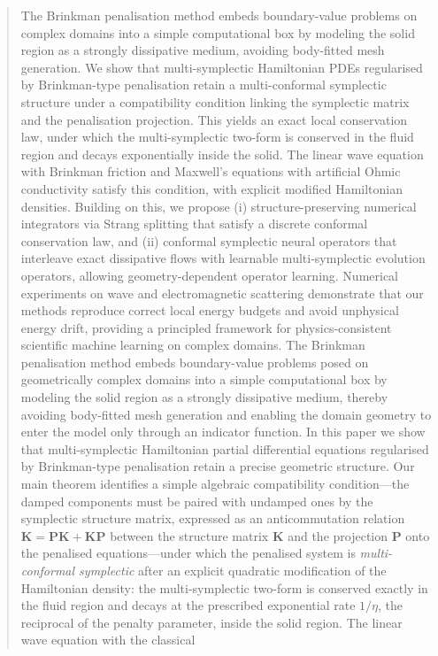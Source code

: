\documentclass[11pt]{article}
\theoremstyle{definition}
\theoremstyle{remark}
\newcommand{\bK}{\bm{K}}
\newcommand{\bP}{\bm{P}}
\begin{document}
\begin{abstract}
The Brinkman penalisation method embeds boundary-value problems on complex domains into a simple computational box by modeling the solid region as a strongly dissipative medium, avoiding body-fitted mesh generation. We show that multi-symplectic Hamiltonian PDEs regularised by Brinkman-type penalisation retain a multi-conformal symplectic structure under a compatibility condition linking the symplectic matrix and the penalisation projection. This yields an exact local conservation law, under which the multi-symplectic two-form is conserved in the fluid region and decays exponentially inside the solid. The linear wave equation with Brinkman friction and Maxwell’s equations with artificial Ohmic conductivity satisfy this condition, with explicit modified Hamiltonian densities. Building on this, we propose (i) structure-preserving numerical integrators via Strang splitting that satisfy a discrete conformal conservation law, and (ii) conformal symplectic neural operators that interleave exact dissipative flows with learnable multi-symplectic evolution operators, allowing geometry-dependent operator learning. Numerical experiments on wave and electromagnetic scattering demonstrate that our methods reproduce correct local energy budgets and avoid unphysical energy drift, providing a principled framework for physics-consistent scientific machine learning on complex domains.
The Brinkman penalisation method embeds boundary-value problems posed
on geometrically complex domains into a simple computational box by
modeling the solid region as a strongly dissipative medium, thereby
avoiding body-fitted mesh generation and enabling the domain geometry
to enter the model only through an indicator function.  In this paper
we show that multi-symplectic Hamiltonian partial differential
equations regularised by Brinkman-type penalisation retain a precise
geometric structure.  Our main theorem identifies a simple algebraic
compatibility condition---the damped components must be paired with
undamped ones by the symplectic structure matrix, expressed as an
anticommutation relation $\bK=\bP\bK+\bK\bP$ between the structure
matrix $\bK$ and the projection $\bP$ onto the penalised
equations---under which the penalised system is
\emph{multi-conformal symplectic} after an explicit quadratic
modification of the Hamiltonian density: the multi-symplectic two-form
is conserved exactly in the fluid region and decays at the prescribed
exponential rate $1/\eta$, the reciprocal of the penalty parameter,
inside the solid region.  The linear wave equation with the classical

\end{abstract}
\end{document}
